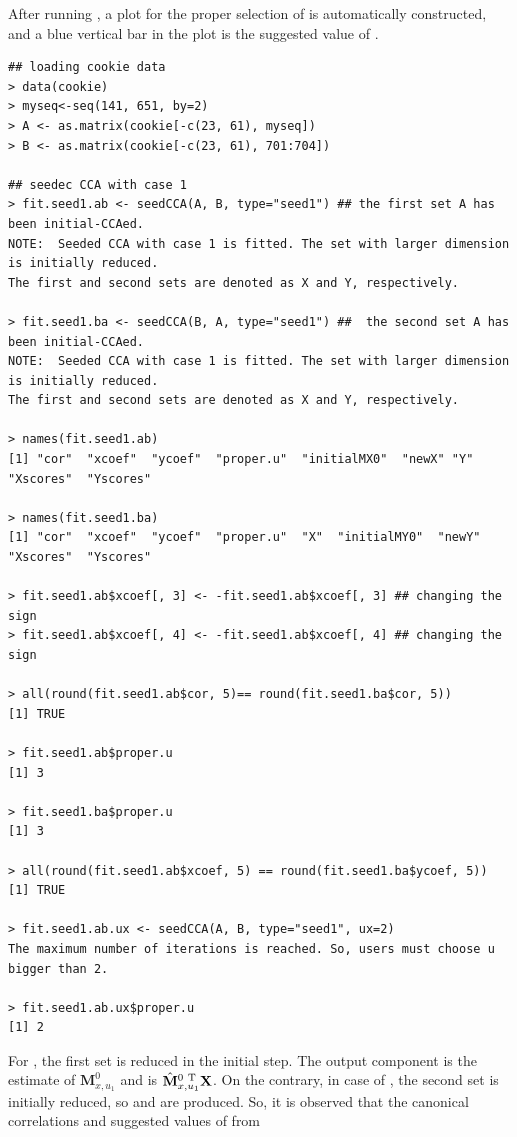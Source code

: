 After running , a plot for the proper selection of  is
automatically constructed, and a blue vertical bar in the plot is the suggested value of .
%
\begin{verbatim}
## loading cookie data
> data(cookie)
> myseq<-seq(141, 651, by=2)
> A <- as.matrix(cookie[-c(23, 61), myseq])
> B <- as.matrix(cookie[-c(23, 61), 701:704])

## seedec CCA with case 1
> fit.seed1.ab <- seedCCA(A, B, type="seed1") ## the first set A has been initial-CCAed.
NOTE:  Seeded CCA with case 1 is fitted. The set with larger dimension is initially reduced.
The first and second sets are denoted as X and Y, respectively.

> fit.seed1.ba <- seedCCA(B, A, type="seed1") ##  the second set A has been initial-CCAed.
NOTE:  Seeded CCA with case 1 is fitted. The set with larger dimension is initially reduced.
The first and second sets are denoted as X and Y, respectively.

> names(fit.seed1.ab)
[1] "cor"  "xcoef"  "ycoef"  "proper.u"  "initialMX0"  "newX" "Y"  "Xscores"  "Yscores"

> names(fit.seed1.ba)
[1] "cor"  "xcoef"  "ycoef"  "proper.u"  "X"  "initialMY0"  "newY"  "Xscores"  "Yscores"

> fit.seed1.ab$xcoef[, 3] <- -fit.seed1.ab$xcoef[, 3] ## changing the sign
> fit.seed1.ab$xcoef[, 4] <- -fit.seed1.ab$xcoef[, 4] ## changing the sign

> all(round(fit.seed1.ab$cor, 5)== round(fit.seed1.ba$cor, 5))
[1] TRUE

> fit.seed1.ab$proper.u
[1] 3

> fit.seed1.ba$proper.u
[1] 3

> all(round(fit.seed1.ab$xcoef, 5) == round(fit.seed1.ba$ycoef, 5))
[1] TRUE

> fit.seed1.ab.ux <- seedCCA(A, B, type="seed1", ux=2)
The maximum number of iterations is reached. So, users must choose u bigger than 2.

> fit.seed1.ab.ux$proper.u
[1] 2
\end{verbatim}
%
For , the first set  is reduced in the initial step.
The output component  is the estimate of ${\mathbf{M}}_{x,u_1}^{0}$ 
and  is ${\hat{\mathbf{M}}}_{x,u_1}^{0~{\rm T}}\mathbf{X}$.
On the contrary, in case of , the second set 
is initially reduced, so  and  are produced.
So, it is observed that the canonical correlations and suggested values of  from
